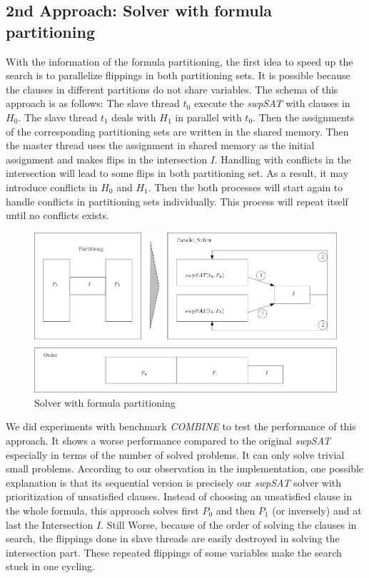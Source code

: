\documentclass[12pt,a4paper,twoside]{scrartcl}
\numberwithin{equation}{section}
\begin{document}
\subsection{2nd Approach: Solver with formula partitioning}
\label{sec:2nd}
With the information of the formula partitioning, the first idea to speed up the search is to parallelize flippings in both partitioning sets. It is possible because the clauses in different partitions do not share variables. The schema of this approach is as follows: The slave thread $t_0$ execute the \emph{swpSAT} with clauses in $H_0$. The slave thread $t_1$ deals with $H_1$ in parallel with $t_0$. Then the assignments of the corresponding partitioning sets are written in the shared memory. Then the master thread uses the assignment in shared memory as the initial assignment and makes flips in the intersection $I$.  Handling with conflicts in the intersection will lead to some flips in both partitioning set. As a result, it may introduce conflicts in $H_0$ and $H_1$. Then the both processes will start again to handle conflicts in partitioning sets individually. This process will repeat itself until no conflicts exists.
\begin{figure}[H]
\begin{center}
  \includegraphics[scale = 0.5]{1/a2.png}
  \end{center}
  \label{a2}
    \caption{Solver with formula partitioning}
  \end{figure}
We did experiments with benchmark \emph{COMBINE} to test the performance of this approach. It shows a worse performance compared to the original \emph{swpSAT} especially in terms of the number of solved problems. It can only solve trivial small problems. According to our observation in the implementation, one possible explanation is that its sequential version is precisely our \emph{swpSAT} solver with prioritization of unsatisfied clauses. Instead of choosing an unsatisfied clause in the whole formula, this approach solves first $P_0$ and then $P_1$ (or inversely) and at last the Intersection $I$. Still Worse, because of the order of solving the clauses in search, the flippings done in slave threads are easily destroyed in solving the intersection part. These repeated flippings of some variables make the search stuck in one cycling.
\end{document}
